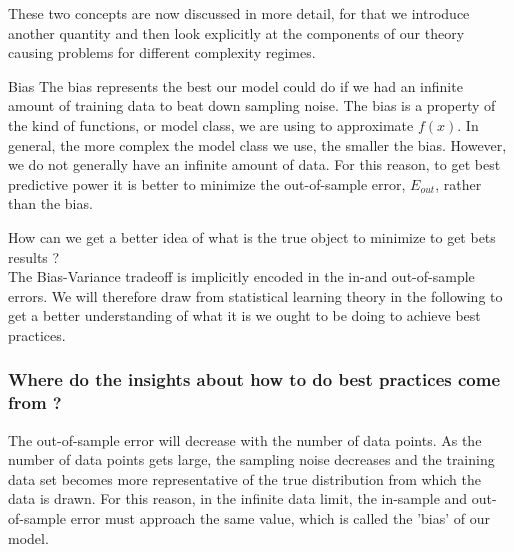 These two concepts are now discussed in more detail, for that we introduce another quantity and then look explicitly at the components of our theory causing problems for different complexity regimes.
\begin{mybox}{Bias}
	The bias represents the best our model could do if we had an infinite amount of training data to beat down sampling noise. The bias is a property of the kind of functions, or model class, we are using to approximate $f(x)$. In general, the more complex the model class we use, the smaller the bias. However, we do not generally have an infinite amount of data. For this reason, to get best predictive power it is better to minimize the out-of-sample error, $E_{out}$, rather than the bias. 
\end{mybox}
How can we get a better idea of what is the true object to minimize to get bets results ? \\
The Bias-Variance tradeoff is implicitly encoded in the in-and out-of-sample errors. We will therefore draw from statistical learning theory in the following to get a better understanding of what it is we ought to be doing to achieve best practices.\\
\subsubsection{Where do the insights about how to do best practices come from ?}
The out-of-sample error will decrease with the number of data points. As the number of data points gets large, the sampling noise decreases and the training data set becomes more representative of the true distribution from which the data is drawn. For this reason, in the infinite data limit, the in-sample and out-of-sample error must approach the same value, which is called the ’bias’ of our model.

